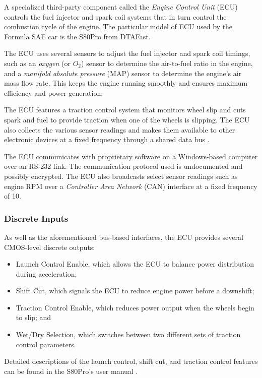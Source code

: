 A specialized third-party component called the \emph{Engine Control Unit} (ECU) controls the fuel injector and spark coil systems that in turn control the combustion cycle of the engine. The particular model of ECU used by the Formula SAE car is the S80Pro from DTAFast.

The ECU uses several sensors to adjust the fuel injector and spark coil timings, such as an \emph{oxygen} (or \emph{$O_{2}$}) sensor to determine the air-to-fuel ratio in the engine, and a \emph{manifold absolute pressure} (MAP) sensor to determine the engine's air mass flow rate. This keeps the engine running smoothly and ensures maximum efficiency and power generation. 

The ECU features a traction control system that monitors wheel slip and cuts spark and fuel to provide traction when one of the wheels is slipping. The ECU also collects the various sensor readings and makes them available to other electronic devices at a fixed frequency through a shared data bus \cite{s80pro}.


The ECU communicates with proprietary software on a Windows-based computer over an RS-232 link. The communication protocol used is undocumented and possibly encrypted. The ECU also broadcasts select sensor readings such as engine RPM over a \emph{Controller Area Network} (CAN) interface at a fixed frequency of \unit{10}{\hertz}.

\subsubsection{Discrete Inputs\label{sec:ecu_background_discrete_inputs}}

As well as the aforementioned bus-based interfaces, the ECU provides several CMOS-level discrete outputs:

\begin{itemize}
    \item Launch Control Enable, which allows the ECU to balance power distribution during acceleration;
    \item Shift Cut, which signals the ECU to reduce engine power before a downshift;
    \item Traction Control Enable, which reduces power output when the wheels begin to slip; and
    \item Wet/Dry Selection, which switches between two different sets of traction control parameters.
\end{itemize}

Detailed descriptions of the launch control, shift cut, and traction control features can be found in the S80Pro's user manual \cite{s80pro}.


